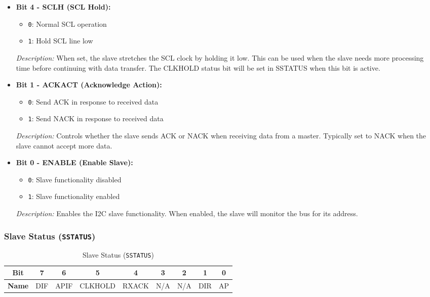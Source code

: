 \begin{itemize}
    \item \textbf{Bit 4 - SCLH (SCL Hold):} 
    \begin{itemize}
        \item \texttt{0}: Normal SCL operation
        \item \texttt{1}: Hold SCL line low
    \end{itemize}
    \textit{Description:} When set, the slave stretches the SCL clock by holding it low. This can be used when the slave needs more processing time before continuing with data transfer. The CLKHOLD status bit will be set in SSTATUS when this bit is active.
    
    \item \textbf{Bit 1 - ACKACT (Acknowledge Action):} 
    \begin{itemize}
        \item \texttt{0}: Send ACK in response to received data
        \item \texttt{1}: Send NACK in response to received data
    \end{itemize}
    \textit{Description:} Controls whether the slave sends ACK or NACK when receiving data from a master. Typically set to NACK when the slave cannot accept more data.
    
    \item \textbf{Bit 0 - ENABLE (Enable Slave):} 
    \begin{itemize}
        \item \texttt{0}: Slave functionality disabled
        \item \texttt{1}: Slave functionality enabled
    \end{itemize}
    \textit{Description:} Enables the I2C slave functionality. When enabled, the slave will monitor the bus for its address.
\end{itemize}

\subsubsection{Slave Status (\texttt{SSTATUS})}
\label{sec:sstatus}

\begin{table}[H]
    \centering
    \caption{Slave Status (\texttt{SSTATUS})}
    \begin{tabular}{@{}ccccccccc@{}}
        \toprule
        \textbf{Bit} & 7 & 6 & 5 & 4 & 3 & 2 & 1 & 0 \\ \midrule
        \textbf{Name} & DIF & APIF & CLKHOLD & RXACK & N/A & N/A & DIR & AP \\ \bottomrule
    \end{tabular}
    \label{tab:sstatus}
\end{table}

